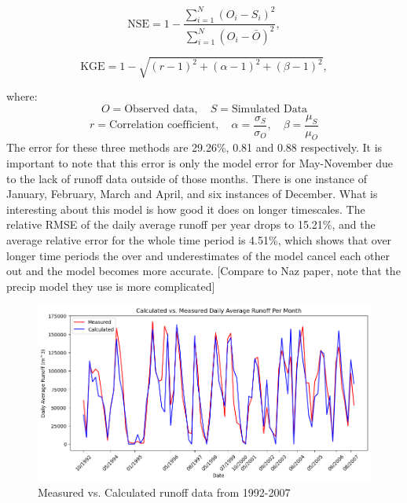 \documentclass{article}
\begin{document}
\begin{equation}
    \mathrm{NSE} = 1 - \frac{\sum_{i=1}^{N}\left( O_i - S_i \right)^2}{\sum_{i=1}^{N}\left( O_i - \bar{O} \right)^2},
\end{equation}

\begin{equation}
    \mathrm{KGE} = 1 - \sqrt{ (r-1)^2 + (\alpha-1)^2 + (\beta-1)^2 },
\end{equation}

\noindent where:
$$O = \text{Observed data}, \quad S=\text{Simulated Data}$$
$$r = \mbox{Correlation coefficient}, \quad \alpha = \frac{\sigma_S}{\sigma_O}, \quad \beta = \frac{\mu_S}{\mu_O}$$
The error for these three methods are 29.26\%, 0.81 and 0.88 respectively. It is important to note that this error is only the model error for 
May-November due to the lack of runoff data outside of those months. There is one instance of January, February, March and April, and six 
instances of December. What is interesting about this model is how good it does on longer 
timescales. The relative RMSE of the daily average runoff per year drops to 15.21\%, and the average relative error
for the whole time period is 4.51\%, which shows that over longer time periods the over and underestimates of the model cancel each 
other out and the model becomes more accurate. [Compare to Naz paper, note that the precip model they use is more complicated]
\begin{figure}[h!]
    \centering
    \includegraphics[width=\textwidth]{Plots/calc_vs_measured.png}
    \caption{Measured vs. Calculated runoff data from 1992-2007}
    \label{fig:calc_vs_measured}
\end{figure}
\FloatBarrier
\end{document}
